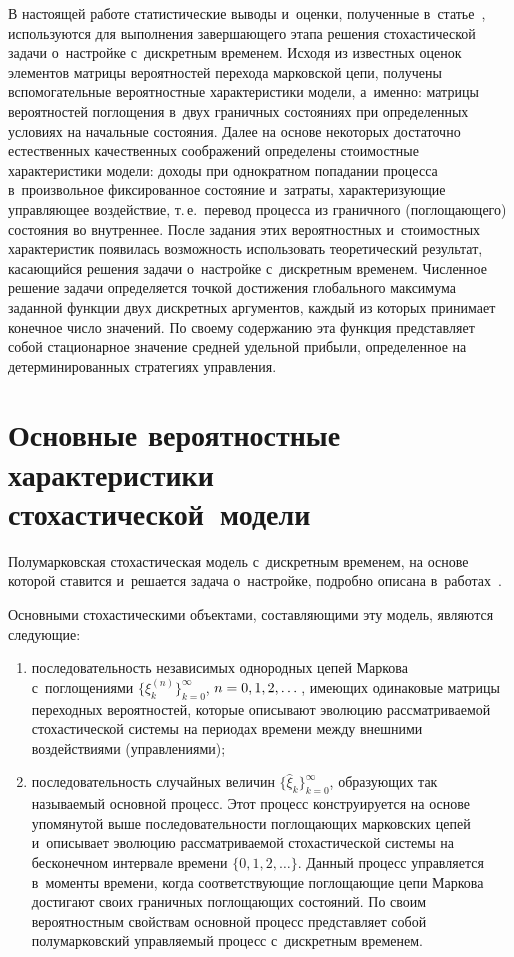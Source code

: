 \begin{multicols}{2}
В настоящей работе статистические выводы и~оценки, полученные в~статье~\cite{A6}, 
используются для выполнения завершающего этапа решения сто\-ха\-сти\-че\-ской 
задачи о~настройке с~дискретным временем. Исходя из известных оценок элементов 
матрицы вероятностей перехода марковской цепи, получены вспомогательные 
вероятностные характеристики модели, а~именно: матрицы вероятностей по\-гло\-ще\-ния 
в~двух граничных состояниях при определенных условиях на начальные со\-сто\-яния. 
Далее на основе некоторых достаточно естественных качественных соображений 
определены стоимостные характеристики модели: доходы при однократном попадании 
процесса в~произвольное фиксированное состояние и~за\-тра\-ты, характеризующие 
управляющее воздействие, т.\,е.\ перевод процесса из граничного (поглощающего) 
со\-сто\-яния во внутреннее. После задания этих вероятностных и~стоимостных 
характеристик появилась воз\-мож\-ность использовать теоретический результат, 
касающийся решения задачи о~настройке с~дискретным временем. Численное решение 
задачи определяется точкой достижения глобального максимума заданной функции 
двух дискретных аргументов, каждый из которых принимает конечное число значений. 
По своему содержанию эта функция пред\-став\-ля\-ет собой стационарное значение 
средней удельной прибыли, определенное на детерминированных стратегиях 
управ\-ле\-ния.

\section{Основные вероятностные характеристики стохастической~модели}

Полумарковская стохастическая модель с~дискретным временем, на основе которой 
ставится и~решается задача о~настройке, по\-дроб\-но описана в~работах~\cite{A1,A4,A5}.

Основными стохастическими объектами, со\-став\-ля\-ющи\-ми эту модель, являются 
следующие:
\begin{enumerate}[(1)]
\item последовательность независимых однородных цепей Маркова с~поглощениями 
$\{ \xi _{k}^{(n)} \}_{k=0}^{\infty}$, $n\hm=0,1,2,\dots$, име\-ющих 
одинаковые матрицы переходных вероятностей, которые описывают эволюцию 
рассматриваемой стохастической системы на периодах времени между внеш\-ни\-ми 
воздействиями (управ\-ле\-ни\-ями);
\item последовательность случайных величин 
$\{\widehat{\xi}_k\}_{k=0}^{\infty}$, образующих так называемый 
основной процесс. Этот процесс конструируется на основе упомянутой выше 
по\-сле\-до\-ва\-тель\-ности по\-гло\-ща\-ющих марковских цепей и~описывает эволюцию 
рас\-смат\-ри\-ва\-емой стохастической сис\-те\-мы на бесконечном интервале времени $\{0, 1, 2,\dots\}$. 
Данный процесс управ\-ля\-ет\-ся в~моменты времени, когда со\-от\-вет\-ст\-ву\-ющие 
поглощающие цепи Маркова достигают своих граничных по\-гло\-ща\-ющих со\-сто\-яний. По 
своим вероятностным свойствам основной процесс пред\-став\-ля\-ет собой полумарковский 
управ\-ля\-емый процесс с~дискретным временем.
\end{enumerate}


\end{multicols}
